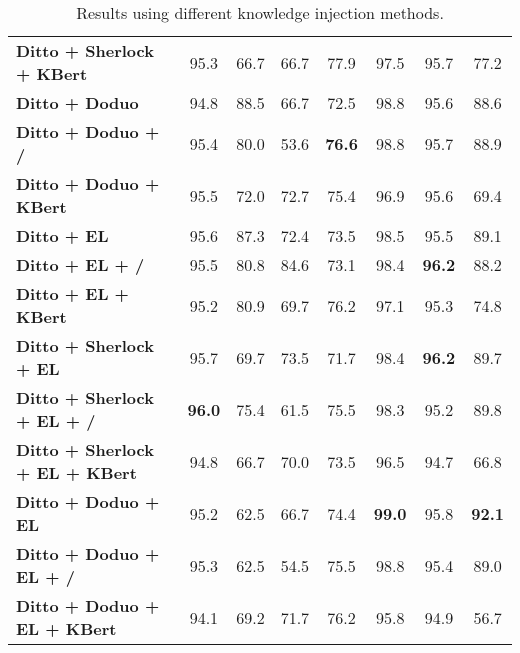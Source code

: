 \begin{table*}[!ht]
{\begin{tabular}{lccccccc}
\textbf{Ditto + Sherlock + KBert}      & 95.3             & 66.7             & 66.7          & 77.9          & 97.5          & 95.7          & 77.2             \\
\textbf{Ditto + Doduo}                 & 94.8             & 88.5             & 66.7          & 72.5          & 98.8          & 95.6          & 88.6             \\
\textbf{Ditto + Doduo + /}             & 95.4             & 80.0             & 53.6          & \textbf{76.6} & 98.8          & 95.7          & 88.9             \\
\textbf{Ditto + Doduo + KBert}         & 95.5             & 72.0             & 72.7          & 75.4          & 96.9          & 95.6          & 69.4             \\
\textbf{Ditto + EL}                    & 95.6             & 87.3             & 72.4          & 73.5          & 98.5          & 95.5          & 89.1             \\
\textbf{Ditto + EL + /}                & 95.5             & 80.8             & 84.6          & 73.1          & 98.4          & \textbf{96.2} & 88.2             \\
\textbf{Ditto + EL + KBert}            & 95.2             & 80.9             & 69.7          & 76.2          & 97.1          & 95.3          & 74.8             \\
\textbf{Ditto + Sherlock + EL}         & 95.7             & 69.7             & 73.5          & 71.7          & 98.4          & \textbf{96.2} & 89.7             \\
\textbf{Ditto + Sherlock + EL + /}     & \textbf{96.0}    & 75.4             & 61.5          & 75.5          & 98.3          & 95.2          & 89.8             \\
\textbf{Ditto + Sherlock + EL + KBert} & 94.8             & 66.7             & 70.0          & 73.5          & 96.5          & 94.7          & 66.8             \\
\textbf{Ditto + Doduo + EL}            & 95.2             & 62.5             & 66.7          & 74.4          & \textbf{99.0} & 95.8          & \textbf{92.1}    \\
\textbf{Ditto + Doduo + EL + /}        & 95.3             & 62.5             & 54.5          & 75.5          & 98.8          & 95.4          & 89.0             \\
\textbf{Ditto + Doduo + EL + KBert}    & 94.1             & 69.2             & 71.7          & 76.2          & 95.8          & 94.9          & 56.7             \\ \hline
\end{tabular}
}
\caption{Results using different knowledge injection methods.}
\label{tab:injection_results}
\end{table*}



